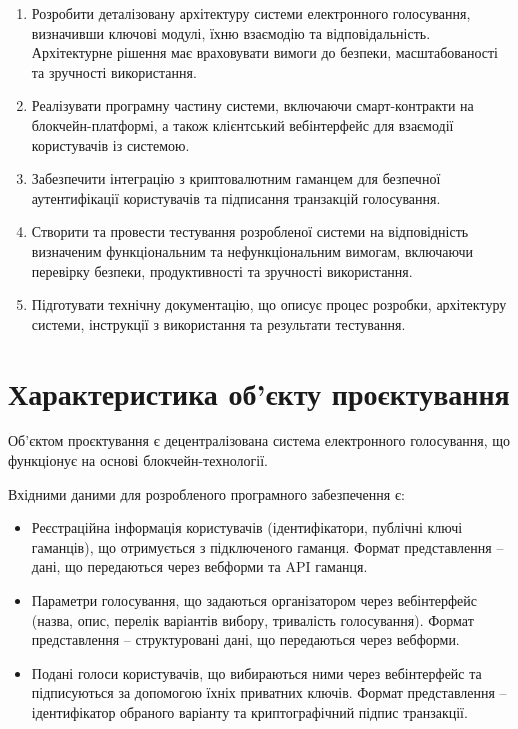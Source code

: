 \documentclass[14pt]{extreport}
\begin{document}
  \begin{enumerate}
    \item Розробити деталізовану архітектуру системи електронного голосування, визначивши ключові модулі, їхню взаємодію та відповідальність. Архітектурне рішення має враховувати вимоги до безпеки, масштабованості та зручності використання.
    \item Реалізувати програмну частину системи, включаючи смарт-контракти на блокчейн-платформі, а також клієнтський вебінтерфейс для взаємодії користувачів із системою.
    \item Забезпечити інтеграцію з криптовалютним гаманцем для безпечної аутентифікації користувачів та підписання транзакцій голосування.
    \item Створити та провести тестування розробленої системи на відповідність визначеним функціональним та нефункціональним вимогам, включаючи перевірку безпеки, продуктивності та зручності використання.
    \item Підготувати технічну документацію, що описує процес розробки, архітектуру системи, інструкції з використання та результати тестування.
  \end{enumerate}
  
  \section{Характеристика об'єкту проєктування}
  
  Об'єктом проєктування є децентралізована система електронного голосування, що функціонує на основі блокчейн-технології.
  
  Вхідними даними для розробленого програмного забезпечення є:
  
  \begin{itemize}
    \item Реєстраційна інформація користувачів (ідентифікатори, публічні ключі гаманців), що отримується з підключеного гаманця. Формат представлення – дані, що передаються через вебформи та API гаманця.
    \item Параметри голосування, що задаються організатором через вебінтерфейс (назва, опис, перелік варіантів вибору, тривалість голосування). Формат представлення – структуровані дані, що передаються через вебформи.
    \item Подані голоси користувачів, що вибираються ними через вебінтерфейс та підписуються за допомогою їхніх приватних ключів. Формат представлення – ідентифікатор обраного варіанту та криптографічний підпис транзакції.
  \end{itemize}
  
\end{document}
